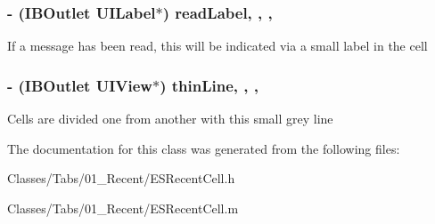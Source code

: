 \subsubsection[{read\+Label}]{\setlength{\rightskip}{0pt plus 5cm}-\/ (I\+B\+Outlet U\+I\+Label$\ast$) read\+Label\hspace{0.3cm}{\ttfamily [read]}, {\ttfamily [write]}, {\ttfamily [nonatomic]}, {\ttfamily [strong]}}\label{interface_e_s_recent_cell_aa3b5c8f99f21172bf77a45729281fb0d}
If a message has been read, this will be indicated via a small label in the cell \hypertarget{interface_e_s_recent_cell_afde07a2962344ebf4fcea0c26677510e}{}
\subsubsection[{thin\+Line}]{\setlength{\rightskip}{0pt plus 5cm}-\/ (I\+B\+Outlet U\+I\+View$\ast$) thin\+Line\hspace{0.3cm}{\ttfamily [read]}, {\ttfamily [write]}, {\ttfamily [nonatomic]}, {\ttfamily [strong]}}\label{interface_e_s_recent_cell_afde07a2962344ebf4fcea0c26677510e}
Cells are divided one from another with this small grey line 

The documentation for this class was generated from the following files\+:\begin{DoxyCompactItemize}
\item 
Classes/\+Tabs/01\+\_\+\+Recent/E\+S\+Recent\+Cell.\+h\item 
Classes/\+Tabs/01\+\_\+\+Recent/E\+S\+Recent\+Cell.\+m\end{DoxyCompactItemize}
